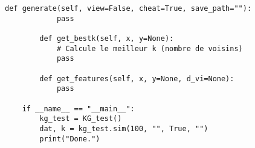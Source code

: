 \documentclass[a4paper,11pt]{article}
\begin{document}
\begin{lstlisting}[caption={Exemple de classe Python}, label={lst:python_code}]
        def generate(self, view=False, cheat=True, save_path=""):
            pass
    
        def get_bestk(self, x, y=None):
            # Calcule le meilleur k (nombre de voisins)
            pass
    
        def get_features(self, x, y=None, d_vi=None):
            pass
    
    if __name__ == "__main__":
        kg_test = KG_test()
        dat, k = kg_test.sim(100, "", True, "")
        print("Done.")
\end{lstlisting}
%

%

%
\end{document}
